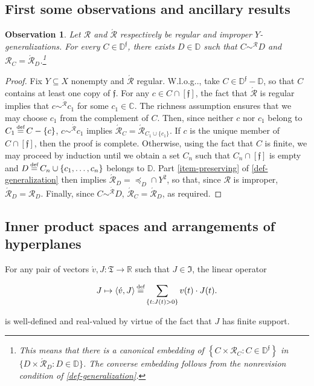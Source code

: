 \documentclass[ecta,nameyear,draft]{econsocart}
\makeatletter
\newcommand{\bs}{-}%
\newcommand{\R}{\mathbb R}
\newcommand{\mc}{\mathcal}
\newcommand\defeq{\mathrel{\overset{\makebox[0pt]{\mbox{\normalfont\tiny def}}}{=}}}%
\newcommand{\novel}{\mathfrak f}
\newcommand{\preceqb}{\mathbin{\preceq}}
\newcommand{\ext}{\mathrel{\mc R}}
\newcommand{\extb}{\mathbin{\mc R}}
\newcommand{\aext}{\mathrel{\acute{\mathrel{\mathcal R}}}}
\newcommand{\aextb}{\mathbin{\acute{\mathbin{\mathcal R}}}}
\newcommand{\mbbd}{{\mathds D}}
\newcommand{\mbbdp}{{\mathds D^{\novel}}}
\newcommand{\mbbc}{{\mathds C}}
\newcommand{\mbbtpp}{{\mathfrak{T}}}
\newcommand{\mbbjpp}{\mathfrak{I}}
\newcommand\Wlog{W\@.l\@.o\@.g\@ifnextchar.{}{.\@}}
\theoremstyle{plain}
\newtheorem{observation}{Observation}
\theoremstyle{remark}
\makeatother
\begin{document}
\begin{appendix}
  \subsection{First some observations and ancillary results}
  \begin{observation}\label{obs-reg-eq}%
    Let $\ext$ and $\aext$ respectively be regular and improper
    $Y$-{generalization}s. For every $C \in \mbbdp$, there exists $D \in \mbbd$
    such that $C \sim^{\extb} D$ and $\extb_{C} = \aextb_{D}$.\footnote{This
      means that there is a canonical embedding of $\left\{C \times \extb_{C}: C
      \in \mbbdp\right\}$ in $\{D \times \aextb_{D}: D \in \mbbd\}$. The
      converse embedding follows from the nonrevision condition of
    \cref{def-generalization}.}
  \end{observation}
  \begin{proof}\label{proof-reg-eq} Fix $Y\subseteq X$ nonempty and $\aext$
    regular.  \Wlog, take $C \in \mbbdp \bs \mbbd$, so that $C$ contains at least
    one copy of $\novel$.  For any $c \in C \cap [ \novel ]$, the fact that
    $\aext$
    is regular implies that $c \sim^{\aextb} c _ 1$ for some $c _ 1 \in \mbbc$. 
    The richness assumption ensures that we may choose $c _ 1$ from the
    complement of $C$.  Then, since neither $c$ nor
    $c_{1}$ belong to $C _ 1 \defeq C \bs \{c\}$, $c \sim^{\aextb} c_{1}$ implies
    $\aextb_{C} = \aextb _ {C _ 1 \cup \{c_{1}\}}$.  If $c$ is the unique member
    of $C \cap [ \novel ]$, then the proof is complete.  Otherwise, using the
    fact that $C$ is finite, we may proceed by induction until we obtain a set $C
    _ n$ such that $C _ n \cap [\novel ]$ is empty and $D \defeq C _ n \cup \{c _
    1 , \dots , c _ n \}$ belongs to $\mbbd$.  Part \ref{item-preserving} of
    \cref{def-generalization} then implies $\aextb _ { D} = \preceqb _ {D} \cap
    Y^{2}$, so that, since $\ext$ is improper, $\aextb_{D}=\extb_{D}$.  Finally,
    since $C \sim^{\aextb} D$, $\aextb _ {C} = \aextb_{D}$, as required.
  \end{proof}

  \subsection{Inner product spaces and arrangements of hyperplanes}
  For any pair of vectors $\acute v, J: \mbbtpp \rightarrow \R$ such that $J
  \in \mbbjpp$, the linear operator
  \begin{linenomath*}
    \begin{equation*}
      J \mapsto \langle \acute v, J \rangle \defeq \sum_{\{t : J(t) > 0\}} v(t)
      \cdot J(t).
    \end{equation*}
  \end{linenomath*}
  is well-defined and real-valued by virtue of the fact that $J$ has finite
  support.


\end{appendix}
\end{document}
